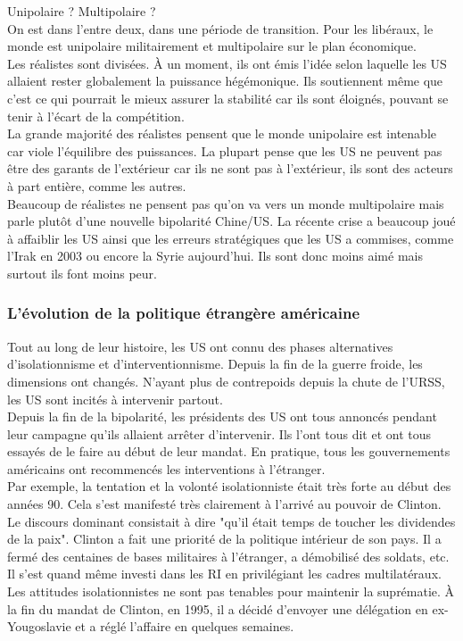 \documentclass[10pt, a4paper, openany]{book}
\begin{document}
Unipolaire ? Multipolaire ? \\
On est dans l'entre deux, dans une période de transition. Pour les libéraux, le monde est unipolaire militairement et multipolaire sur le plan économique. \\
Les réalistes sont divisées. À un moment, ils ont émis l'idée selon laquelle les US allaient rester globalement la puissance hégémonique. Ils soutiennent même que c'est ce qui pourrait le mieux assurer la stabilité car ils sont éloignés, pouvant se tenir à l'écart de la compétition. \\
La grande majorité des réalistes pensent que le monde unipolaire est intenable car viole l'équilibre des puissances. La plupart pense que les US ne peuvent pas être des garants de l'extérieur car ils ne sont pas à l'extérieur, ils sont des acteurs à part entière, comme les autres. \\
Beaucoup de réalistes ne pensent pas qu'on va vers un monde multipolaire mais parle plutôt d'une nouvelle bipolarité Chine/US. La récente crise a beaucoup joué à affaiblir les US ainsi que les erreurs stratégiques que les US a commises, comme l'Irak en 2003 ou encore la Syrie aujourd'hui. Ils sont donc moins aimé mais surtout ils font moins peur.

\subsubsection{L'évolution de la politique étrangère américaine}

Tout au long de leur histoire, les US ont connu des phases alternatives d'isolationnisme et d'interventionnisme. Depuis la fin de la guerre froide, les dimensions ont changés. N'ayant plus de contrepoids depuis la chute de l'URSS, les US sont incités à intervenir partout. \\
Depuis la fin de la bipolarité, les présidents des US ont tous annoncés pendant leur campagne qu'ils allaient arrêter d'intervenir. Ils l'ont tous dit et ont tous essayés de le faire au début de leur mandat. En pratique, tous les gouvernements américains ont recommencés les interventions à l'étranger. \\
Par exemple, la tentation et la volonté isolationniste était très forte au début des années 90. Cela s'est manifesté très clairement à l'arrivé au pouvoir de Clinton. Le discours dominant consistait à dire "qu'il était temps de toucher les dividendes de la paix". Clinton a fait une priorité de la politique intérieur de son pays. Il a fermé des centaines de bases militaires à l'étranger, a démobilisé des soldats, etc. Il s'est quand même investi dans les RI en privilégiant les cadres multilatéraux. \\
Les attitudes isolationnistes ne sont pas tenables pour maintenir la suprématie. À la fin du mandat de Clinton, en 1995, il a décidé d'envoyer une délégation en ex-Yougoslavie et a réglé l'affaire en quelques semaines.
\end{document}
